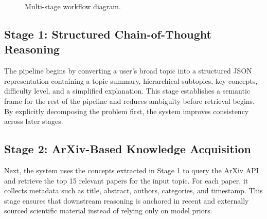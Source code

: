 \documentclass[conference]{IEEEtran}
\begin{document}
\begin{figure}[htbp]
\centering
{}
\caption{Multi-stage workflow diagram.}
\label{fig:workflow}
\end{figure}

\subsection{Stage 1: Structured Chain-of-Thought Reasoning}
The pipeline begins by converting a user's broad topic into a structured JSON representation containing a topic summary, hierarchical subtopics, key concepts, difficulty level, and a simplified explanation. This stage establishes a semantic frame for the rest of the pipeline and reduces ambiguity before retrieval begins. By explicitly decomposing the problem first, the system improves consistency across later stages.

\subsection{Stage 2: ArXiv-Based Knowledge Acquisition}
Next, the system uses the concepts extracted in Stage 1 to query the ArXiv API and retrieve the top 15 relevant papers for the input topic. For each paper, it collects metadata such as title, abstract, authors, categories, and timestamp. This stage ensures that downstream reasoning is anchored in recent and externally sourced scientific material instead of relying only on model priors.
\end{document}
